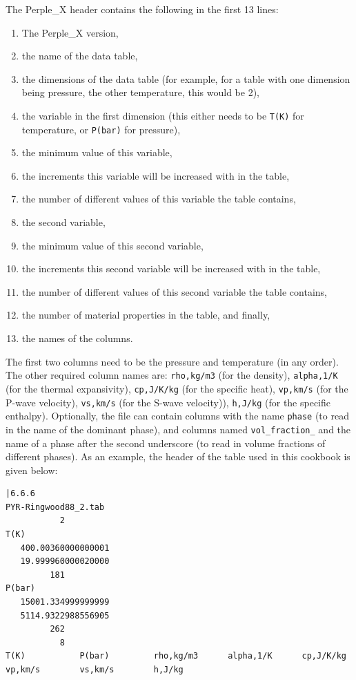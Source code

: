 The Perple\_X header contains the following in the first 13 lines: 
\begin{enumerate}
  \item The Perple\_X version,
  \item the name of the data table,
  \item the dimensions of the data table (for example, for a table with one dimension being pressure, the other temperature, this would be 2),
  \item the variable in the first dimension (this either needs to be \texttt{T(K)} for temperature, or \texttt{P(bar)} for pressure),
  \item the minimum value of this variable,
  \item the increments this variable will be increased with in the table,
  \item the number of different values of this variable the table contains,
  \item the second variable,
  \item the minimum value of this second variable,
  \item the increments this second variable will be increased with in the table,
  \item the number of different values of this second variable the table contains,
  \item the number of material properties in the table, and finally,
  \item the names of the columns.
\end{enumerate}
The first two columns need to be the pressure and temperature (in any order). The other required column names are:
\texttt{rho,kg/m3} (for the density), \texttt{alpha,1/K} (for the thermal expansivity), \texttt{cp,J/K/kg} (for the specific heat), \texttt{vp,km/s} (for the P-wave velocity), \texttt{vs,km/s} (for the S-wave velocity)), \texttt{h,J/kg} (for the specific enthalpy).
Optionally, the file can contain columns with the name \texttt{phase} (to read in the name of the dominant phase), and columns named \texttt{vol\_fraction\_} and the name of a phase after the second underscore (to read in volume fractions of different phases).
As an example, the header of the table used in this cookbook is given below:

\begin{lstlisting}
|6.6.6
PYR-Ringwood88_2.tab                                                                                
           2
T(K)    
   400.00360000000001     
   19.999960000020000     
         181
P(bar)  
   15001.334999999999     
   5114.9322988556905     
         262
           8
T(K)           P(bar)         rho,kg/m3      alpha,1/K      cp,J/K/kg      vp,km/s        vs,km/s        h,J/kg 
\end{lstlisting}

